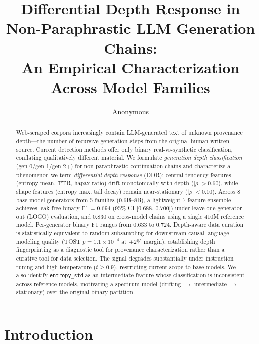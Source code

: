 \documentclass[11pt,a4paper]{article}
\title{Differential Depth Response in Non-Paraphrastic LLM Generation Chains: \\
An Empirical Characterization Across Model Families}
\author{Anonymous}
\begin{document}
\maketitle

\begin{abstract}
Web-scraped corpora increasingly contain LLM-generated text of unknown provenance depth---the number of recursive generation steps from the original human-written source.
Current detection methods offer only binary real-vs-synthetic classification, conflating qualitatively different material.
We formulate \emph{generation depth classification} (gen-0/gen-1/gen-2+) for non-paraphrastic continuation chains and characterize a phenomenon we term \emph{differential depth response} (DDR): central-tendency features (entropy mean, TTR, hapax ratio) drift monotonically with depth ($|\rho| > 0.60$), while shape features (entropy max, tail decay) remain near-stationary ($|\rho| < 0.10$).
Across 8 base-model generators from 5 families (0.6B--8B), a lightweight 7-feature ensemble achieves leak-free binary F1 = 0.694 (95\% CI [0.688, 0.700]) under leave-one-generator-out (LOGO) evaluation, and 0.830 on cross-model chains using a single 410M reference model.
Per-generator binary F1 ranges from 0.633 to 0.724.
Depth-aware data curation is statistically equivalent to random subsampling for downstream causal language modeling quality (TOST $p = 1.1 \times 10^{-4}$ at $\pm$2\% margin), establishing depth fingerprinting as a diagnostic tool for provenance characterization rather than a curative tool for data selection.
The signal degrades substantially under instruction tuning and high temperature ($t \geq 0.9$), restricting current scope to base models.
We also identify \texttt{entropy\_std} as an intermediate feature whose classification is inconsistent across reference models, motivating a spectrum model (drifting $\to$ intermediate $\to$ stationary) over the original binary partition.
\end{abstract}

\section{Introduction}
\end{document}
